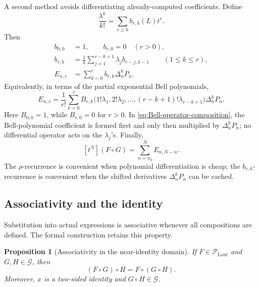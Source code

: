\documentclass[11pt]{article}
\theoremstyle{pltheorem}
\newtheorem{proposition}[theorem]{Proposition}
\newcommand{\PLL}{\mathscr P_{\mathrm{Laur}}}
\newcommand{\Gnear}{\mathcal G}
\newcommand{\compose}{\mathbin{\circ}}
\begin{document}
A second method avoids differentiating already-computed coefficients.  Define
\begin{equation}\label{eq:b-r-k-def}
 \frac{\lambda^k}{k!}=\sum_{r\ge k}b_{r,k}(L)t^r.
\end{equation}
Then
\begin{align}
 b_{0,0}&=1,\qquad b_{r,0}=0\quad(r>0),\label{eq:b-boundary}\\
 b_{r,k}&=\frac1k\sum_{j=1}^{r-k+1}
 \lambda_jb_{r-j,k-1}
 \qquad(1\le k\le r),\label{eq:b-recurrence}\\
 E_{n,r}&=\sum_{k=0}^{r}b_{r,k}\Delta_n^kP_n.\label{eq:E-from-b}
\end{align}
Equivalently, in terms of the partial exponential Bell polynomials,
\begin{equation}\label{eq:Bell-operator-composition}
 E_{n,r}=\frac1{r!}\sum_{k=0}^{r}
 B_{r,k}\bigl(1!\lambda_1,2!\lambda_2,\ldots,
 (r-k+1)!\lambda_{r-k+1}\bigr)\Delta_n^kP_n.
\end{equation}
Here \(B_{0,0}=1\), while \(B_{r,0}=0\) for \(r>0\).
In \cref{eq:Bell-operator-composition}, the Bell-polynomial coefficient
is formed first and only then multiplied by \(\Delta_n^kP_n\); no
differential operator acts on the \(\lambda_j\)'s.  Finally,
\begin{equation}\label{eq:compose-from-E}
 [t^N](F\compose G)=\sum_{n=n_0}^{N}E_{n,N-n}.
\end{equation}
The \(\rho\)-recurrence is convenient when polynomial differentiation is
cheap; the \(b_{r,k}\)-recurrence is convenient when the shifted
derivatives \(\Delta_n^kP_n\) can be cached.

\subsection{Associativity and the identity}

Substitution into actual expressions is associative whenever all compositions are defined.  The formal construction retains this property.

\begin{proposition}[Associativity in the near-identity domain]\label{prop:composition-associative}
If \(F\in\PLL\) and \(G,H\in\Gnear\), then
\begin{equation}\label{eq:composition-assoc}
 (F\compose G)\compose H=F\compose(G\compose H).
\end{equation}
Moreover, \(x\) is a two-sided identity and \(G\compose H\in\Gnear\).
\end{proposition}
\end{document}
